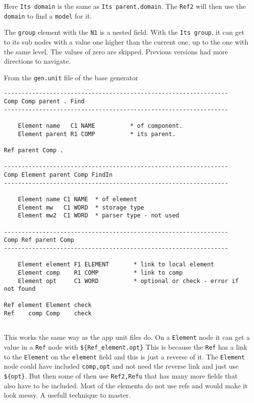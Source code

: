 \documentclass[11pt]{article}
\begin{document}
Here \texttt{Its\ domain} is the same as \texttt{Its\ parent.domain}.
The \texttt{Ref2} will then use the \texttt{domain} to find a
\texttt{model} for it.

The \texttt{group} element with the \texttt{N1} is a nested field. With
the \texttt{Its\ group}, it can get to its sub nodes with a value one
higher than the current one, up to the one with the same level. The
values of zero are skipped. Previous versions had more directions to
navigate.

From the \texttt{gen.unit} file of the base generator

\begin{verbatim}
----------------------------------------------------------------
Comp Comp parent . Find
----------------------------------------------------------------

    Element name   C1 NAME          * of component.
    Element parent R1 COMP          * its parent.

Ref parent Comp .

----------------------------------------------------------------
Comp Element parent Comp FindIn
----------------------------------------------------------------

    Element name C1 NAME  * of element
    Element mw   C1 WORD  * storage type
    Element mw2  C1 WORD  * parser type - not used
    
----------------------------------------------------------------
Comp Ref parent Comp
----------------------------------------------------------------

    Element element F1 ELEMENT       * link to local element
    Element comp    R1 COMP          * link to comp
    Element opt     C1 WORD          * optional or check - error if not found
    
Ref element Element check
Ref    comp Comp    check
    
\end{verbatim}

This works the same way as the app unit files do. On a \texttt{Element}
node it can get a value in a \texttt{Ref} node with
\texttt{\$\{Ref\_element.opt\}} This is because the \texttt{Ref} has a
link to the \texttt{Element} on the \texttt{element} field and this is
just a reverse of it. The \texttt{Element} node could have included
\texttt{comp,opt} and not need the reverse link and just use
\texttt{\$\{opt\}}. But then some of then use \texttt{Ref2,Refu} that
has many more fields that also have to be included. Most of the elements
do not use refs and would make it look messy. A usefull technique to
master.
\end{document}
